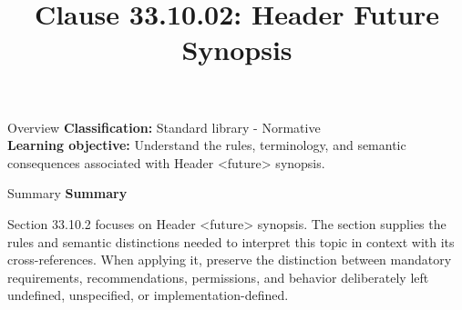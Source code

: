 \documentclass[10pt,letterpaper]{article}
\title{Clause 33.10.02: Header Future Synopsis}
\author{}
\date{}
\begin{document}
\maketitle
\begin{CornellOverviewBox}{Overview}
\textbf{Classification:} Standard library - Normative\\[2pt]
\textbf{Learning objective:} Understand the rules, terminology, and semantic consequences associated with Header <future> synopsis.
\end{CornellOverviewBox}\begin{CornellSummaryBox}{Summary}
{\sffamily\bfseries\color{Accent} Summary}\par\vspace{3pt}Section 33.10.2 focuses on Header <future> synopsis. The section supplies the rules and semantic distinctions needed to interpret this topic in context with its cross-references. When applying it, preserve the distinction between mandatory requirements, recommendations, permissions, and behavior deliberately left undefined, unspecified, or implementation-defined.
\end{CornellSummaryBox}
\end{document}
